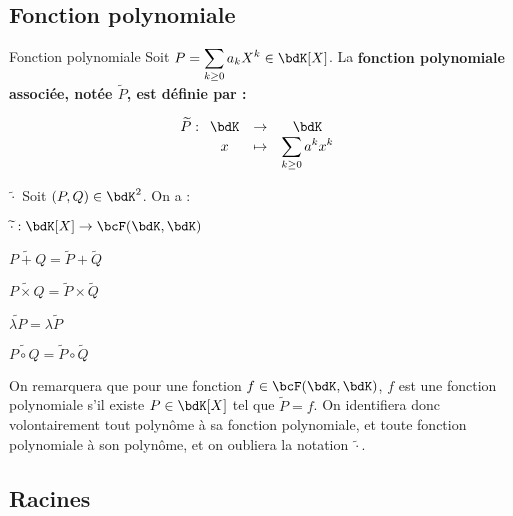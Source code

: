\documentclass[a4paper,french,bookmarks]{article}
\begin{document}
\subsection{Fonction polynomiale}

\begin{definition}{Fonction polynomiale}{}
    Soit $\displaystyle P = \sum_{k\geq0} a_kX^k \in \bdK[X]$. La \bf{fonction polynomiale associée}, notée $\widetilde P$, est définie par :
    
    \[ \widetilde P : \begin{array}[t]{ccc}
        \bdK &\to& \bdK  \\
        x &\mapsto&\displaystyle \sum_{k\geq0} a^kx^k
    \end{array}\]
\end{definition}

\begin{property}{ \quad $\widetilde \cdot$}{}
     Soit $(P, Q) \in \bdK^2$. On a :
     
    \begin{multicols}{2}
        \begin{enumerate}
            \ithand $\widetilde \cdot : \bdK[X] \to \bcF(\bdK, \bdK)$
            
            \ithand $\widetilde{P+Q} = \widetilde P + \widetilde Q$
            
            \ithand $\widetilde{P\times Q} = \widetilde{P} \times \widetilde{Q}$
            
            \ithand $\widetilde{\lambda P} = \lambda \widetilde P$
            
            \ithand $\widetilde{P \circ Q} = \widetilde{P} \circ \widetilde{Q}$
        \end{enumerate}
    \end{multicols}
     
\end{property}


On remarquera que pour une fonction $f \in \bcF(\bdK, \bdK)$, $f$ est une fonction polynomiale s'il existe $P \in \bdK[X]$ tel que $\widetilde P = f$. On identifiera donc volontairement tout polynôme à sa fonction polynomiale, et toute fonction polynomiale à son polynôme, et on oubliera la notation $\widetilde \cdot$.

\subsection{Racines}
\end{document}
